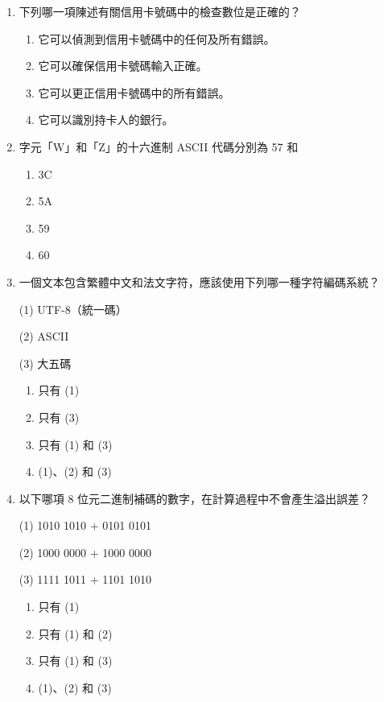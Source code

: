 \documentclass[12pt,a4paper]{article}
\newcommand{\answerline}[1]{\underline{\hspace{#1}}}
\begin{document}
\begin{enumerate}
\item 下列哪一項陳述有關信用卡號碼中的檢查數位是正確的？

\begin{enumerate}[label=\Alph*.]
\item 它可以偵測到信用卡號碼中的任何及所有錯誤。
\item 它可以確保信用卡號碼輸入正確。
\item 它可以更正信用卡號碼中的所有錯誤。
\item 它可以識別持卡人的銀行。
\end{enumerate}

\item 字元「W」和「Z」的十六進制 ASCII 代碼分別為 57 和 \answerline{2cm}

\begin{enumerate}[label=\Alph*.]
\item 3C
\item 5A
\item 59
\item 60
\end{enumerate}

\item 一個文本包含繁體中文和法文字符，應該使用下列哪一種字符編碼系統？

(1) UTF-8（統一碼）

(2) ASCII

(3) 大五碼

\begin{enumerate}[label=\Alph*.]
\item 只有 (1)
\item 只有 (3)
\item 只有 (1) 和 (3)
\item (1)、(2) 和 (3)
\end{enumerate}

\item 以下哪項 8 位元二進制補碼的數字，在計算過程中不會產生溢出誤差？

(1) 1010 1010 + 0101 0101

(2) 1000 0000 + 1000 0000

(3) 1111 1011 + 1101 1010

\begin{enumerate}[label=\Alph*.]
\item 只有 (1)
\item 只有 (1) 和 (2)
\item 只有 (1) 和 (3)
\item (1)、(2) 和 (3)
\end{enumerate}


\end{enumerate}
\end{document}
